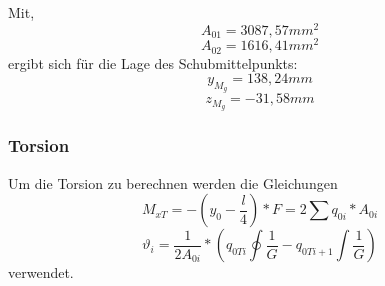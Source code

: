 Mit,
$$A_{01}=3087,57mm^2$$
$$A_{02}=1616,41mm^2$$
ergibt sich für die Lage des Schubmittelpunkts:
$$y_{M_{g}}=138,24mm$$
$$z_{M_{g}}=-31,58mm$$

\subsubsection{Torsion}
Um die Torsion zu berechnen werden die Gleichungen
$$M_{xT}=-(y_{0}-\frac{l}{4})*F=2\sum q_{0i}*A_{0i}$$
$$\vartheta_{i}=\frac{1}{2 A_{0i}}*(q_{0Ti}\oint\frac{1}{G}-q_{0Ti+1}\int\frac{1}{G})$$
verwendet.












